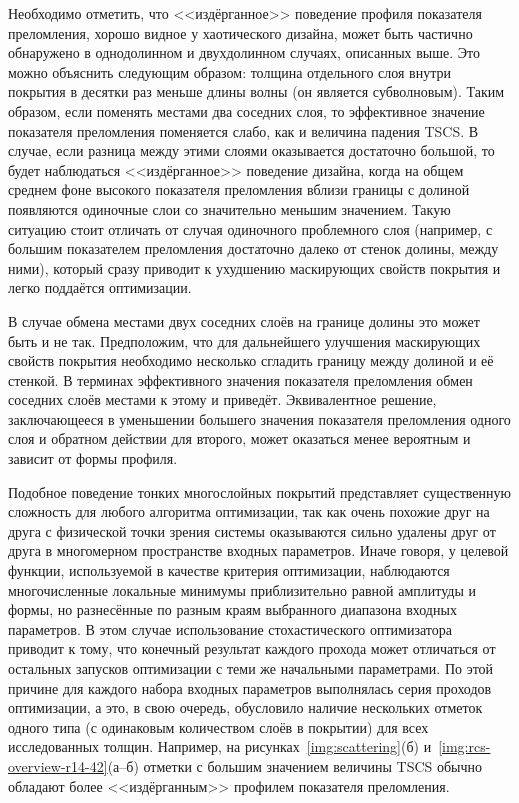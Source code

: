 Необходимо отметить, что <<издёрганное>> поведение профиля показателя
преломления, хорошо видное у хаотического дизайна, может быть
частично обнаружено в однодолинном и двухдолинном случаях,
описанных выше.  Это можно объяснить следующим образом: толщина
отдельного слоя внутри покрытия в десятки раз меньше длины волны (он
является субволновым).  Таким образом, если поменять местами два
соседних слоя, то эффективное значение показателя преломления
поменяется слабо, как и величина падения TSCS.  В случае, если разница
между этими слоями оказывается
достаточно большой, то будет наблюдаться <<издёрганное>> поведение дизайна,
 когда на общем среднем фоне высокого
показателя преломления вблизи границы с долиной появляются одиночные
слои со значительно меньшим значением.
 Такую ситуацию стоит отличать от случая одиночного
проблемного слоя (например, с большим показателем преломления
достаточно далеко от стенок долины, между ними), который сразу приводит к
ухудшению маскирующих свойств покрытия и легко поддаётся оптимизации.

В случае обмена местами двух соседних слоёв на границе долины это
может быть и не так. Предположим, что для дальнейшего улучшения
маскирующих свойств покрытия необходимо несколько сгладить границу
между долиной и её стенкой. В терминах эффективного значения
показателя преломления обмен соседних слоёв местами к этому и
приведёт. Эквивалентное решение, заключающееся в уменьшении большего
значения показателя преломления одного слоя и обратном действии для
второго, может оказаться менее вероятным и зависит от формы
профиля.

Подобное поведение тонких многослойных покрытий представляет
существенную сложность для любого алгоритма оптимизации, так как очень
похожие друг на друга с физической точки зрения системы оказываются
сильно удалены друг от друга в многомерном пространстве входных
параметров.  Иначе говоря, у целевой функции, используемой в качестве
критерия оптимизации, наблюдаются многочисленные локальные минимумы
приблизительно равной амплитуды и формы, но разнесённые по разным
краям выбранного диапазона входных параметров.  В этом случае
использование стохастического оптимизатора приводит к тому, что
конечный результат каждого прохода может отличаться от остальных
запусков оптимизации с теми же начальными параметрами.  По этой
причине для каждого набора входных параметров выполнялась серия
проходов оптимизации, а это, в свою очередь, обусловило наличие
нескольких отметок одного типа (с одинаковым количеством слоёв в
покрытии) для всех исследованных толщин. Например, на
рисунках~\ref{img:scattering}(б) и~\ref{img:rcs-overview-r14-42}(а--б)
отметки с большим значением величины TSCS обычно обладают более
<<издёрганным>> профилем показателя преломления.

